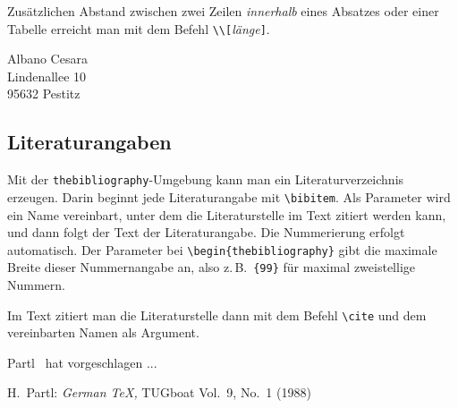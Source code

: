 Zusätzlichen Abstand zwischen zwei Zeilen \emph{innerhalb}
eines Absatzes oder einer Tabelle erreicht man mit dem Befehl
\lstinline|\\[|\textit{länge}\lstinline|]|.

\begin{LTXexample}
Albano Cesara \\
Lindenallee 10 \\[1.5ex]
95632 Pestitz
\end{LTXexample}






\subsection{Literaturangaben}

Mit der \texttt{thebibliography}-Umgebung kann man ein
Literaturverzeichnis erzeugen.
Darin beginnt jede Literaturangabe mit \lstinline|\bibitem|.
Als Parameter wird ein Name vereinbart, unter dem die
Literaturstelle im Text zitiert werden kann, und
dann folgt der Text der Literaturangabe.
Die Nummerierung erfolgt automatisch.
Der Parameter bei \lstinline|\begin{thebibliography}| gibt die
maximale Breite dieser Nummernangabe an, also z.\,B.\
\lstinline|{99}| für maximal zweistellige Nummern.

Im Text zitiert man die Literaturstelle dann mit dem Befehl \lstinline|\cite|
und dem vereinbarten Namen als Argument.

\let\origcite\cite
\begin{LTXexample}[preset=\let\cite\origcite]
Partl~\cite{pa} hat
vorgeschlagen ...

\begin{thebibliography}{99}
H.~Partl: \textit{German \TeX,}
TUGboat Vol.~9, No.~1 (1988)
\end{thebibliography}
\end{LTXexample}

